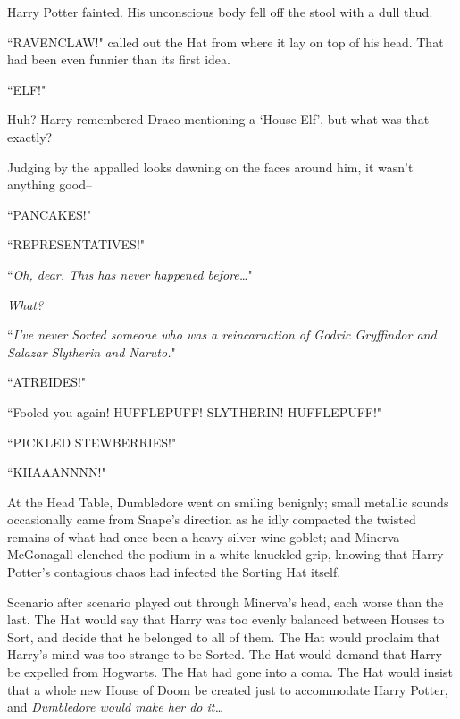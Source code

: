 Harry Potter fainted. His unconscious body fell off the stool with a dull thud.

``RAVENCLAW!" called out the Hat from where it lay on top of his head. That had been even funnier than its first idea.

\later

``ELF!"

Huh? Harry remembered Draco mentioning a `House Elf', but what was that exactly?

Judging by the appalled looks dawning on the faces around him, it wasn't anything good\---

\later

``PANCAKES!"

\later

``REPRESENTATIVES!"

\later

``\emph{Oh, dear. This has never happened before{\ldots}}"

\emph{What?}

``\emph{I've never Sorted someone who was a reincarnation of Godric Gryffindor \emph{and} Salazar Slytherin \emph{and} Naruto.}"

\later

``ATREIDES!"

\later

``Fooled you again! HUFFLEPUFF! SLYTHERIN! HUFFLEPUFF!"

\later

``PICKLED STEWBERRIES!"

\later

``KHAAANNNN!"

\later

At the Head Table, Dumbledore went on smiling benignly; small metallic sounds occasionally came from Snape's direction as he idly compacted the twisted remains of what had once been a heavy silver wine goblet; and Minerva McGonagall clenched the podium in a white-knuckled grip, knowing that Harry Potter's contagious chaos had infected the Sorting Hat itself.

Scenario after scenario played out through Minerva's head, each worse than the last. The Hat would say that Harry was too evenly balanced between Houses to Sort, and decide that he belonged to all of them. The Hat would proclaim that Harry's mind was too strange to be Sorted. The Hat would demand that Harry be expelled from Hogwarts. The Hat had gone into a coma. The Hat would insist that a whole new House of Doom be created just to accommodate Harry Potter, and \emph{Dumbledore would make her do it{\ldots}}

